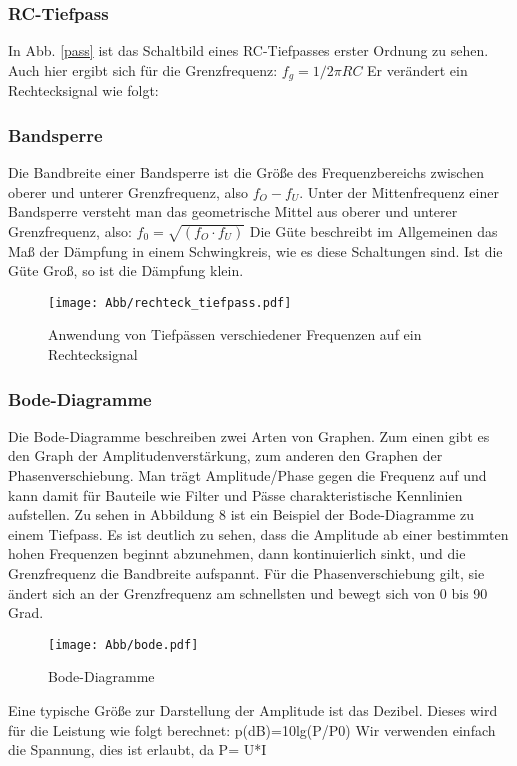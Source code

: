 \subsubsection{RC-Tiefpass}

In Abb. \ref{pass} ist das Schaltbild eines RC-Tiefpasses erster Ordnung zu sehen. Auch hier ergibt sich für die Grenzfrequenz: $f_g=1/2 \pi RC$
Er verändert ein Rechtecksignal wie folgt:

\subsubsection{Bandsperre}
Die Bandbreite einer Bandsperre ist die Größe des Frequenzbereichs zwischen oberer und unterer Grenzfrequenz, also $f_O -f_U$.
Unter der Mittenfrequenz einer Bandsperre versteht man das geometrische Mittel aus oberer und unterer Grenzfrequenz, also: $f_0=\sqrt{(f_O \cdot f_U)}$
Die Güte beschreibt im Allgemeinen das Maß der Dämpfung in einem Schwingkreis, wie es diese Schaltungen sind.
Ist die Güte Groß, so ist die Dämpfung klein.
\begin{figure}[H]
    \centering
	\texttt{[image: Abb/rechteck\_tiefpass.pdf]} 
    \caption{Anwendung von Tiefpässen verschiedener Frequenzen auf ein Rechtecksignal}
\end{figure}

\subsubsection{Bode-Diagramme}
Die Bode-Diagramme beschreiben zwei Arten von Graphen. Zum einen gibt es den Graph der Amplitudenverstärkung, zum anderen den Graphen der Phasenverschiebung. Man trägt Amplitude/Phase gegen die Frequenz auf und kann damit für Bauteile wie Filter und Pässe charakteristische Kennlinien aufstellen. Zu sehen in Abbildung 8 ist ein Beispiel der Bode-Diagramme zu einem Tiefpass. Es ist deutlich zu sehen, dass die Amplitude ab einer bestimmten hohen Frequenzen beginnt abzunehmen, dann kontinuierlich sinkt, und die Grenzfrequenz die Bandbreite aufspannt. Für die Phasenverschiebung gilt, sie ändert sich an der Grenzfrequenz am schnellsten und bewegt sich von 0 bis 90 Grad.
\begin{figure}[H]
    \centering
    \texttt{[image: Abb/bode.pdf]}
    \caption{Bode-Diagramme} 
\end{figure}

Eine typische Größe zur Darstellung der Amplitude ist das Dezibel. Dieses wird für die Leistung wie folgt berechnet:
p(dB)=10lg(P/P0)
Wir verwenden einfach die Spannung, dies ist erlaubt, da P= U*I

